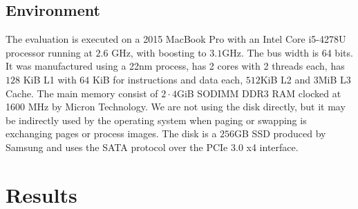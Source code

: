     \subsection*{Environment}
        The evaluation is executed on a 2015 MacBook Pro with an Intel Core i5-4278U processor running at $2.6$ GHz, with boosting to $3.1$GHz. The bus width is 64 bits. 
        It was manufactured using a 22nm process, has 2 cores with 2 threads each, has $128$ KiB L1 with $64$ KiB for instructions and data each, $512$KiB L2 and 3MiB L3 Cache.
        The main memory consist of $2 \cdot 4$GiB SODIMM DDR3 RAM clocked at 1600 MHz by Micron Technology.
        We are not using the disk directly, but it may be indirectly used by the operating system when paging or swapping is exchanging pages or process images.
        The disk is a $256$GB SSD produced by Samsung and uses the SATA protocol over the PCIe 3.0 x4 interface.
    
\section{Results}\label{\positionnumber}

